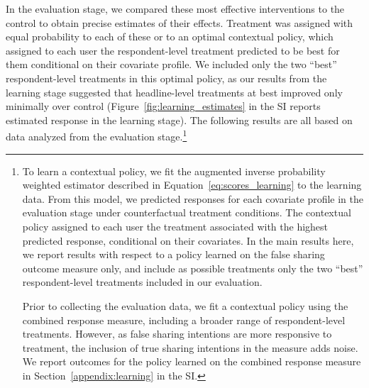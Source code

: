 \documentclass[letterpaper, 12pt, parskip=full,DIV=10]{scrartcl}
\begin{document}
In the evaluation stage, we compared these most effective interventions to the control to obtain precise estimates of their effects. Treatment was assigned with equal probability to each of these or to an optimal contextual policy, which assigned to each user the respondent-level treatment predicted to be best for them conditional on their covariate profile. We included only the two ``best'' respondent-level treatments in this optimal policy, as our results from the learning stage suggested that headline-level treatments at best improved only minimally over control (Figure~\ref{fig:learning_estimates} in the SI reports estimated response in the learning stage). The following results are all based on data analyzed from the evaluation stage.\footnote{{
To learn a contextual policy, we fit the augmented inverse probability weighted estimator described in Equation~\ref{eq:scores_learning} to the learning data. From this model, we predicted responses for each covariate profile in the evaluation stage under counterfactual treatment conditions. The contextual policy assigned to each user the treatment associated with the highest predicted response, conditional on their covariates. In the main results here, we report results with respect to a policy learned on the false sharing outcome measure only, and include as possible treatments only the two ``best'' respondent-level treatments included in our evaluation.  %
 
Prior to collecting the evaluation data, we fit a contextual policy using the combined response measure, including a broader range of respondent-level treatments. However, as false sharing intentions are more responsive to treatment, the inclusion of true sharing intentions in the measure adds noise. We report outcomes for the policy learned on the combined response measure in Section~\ref{appendix:learning} in the SI. 
}}
\end{document}
